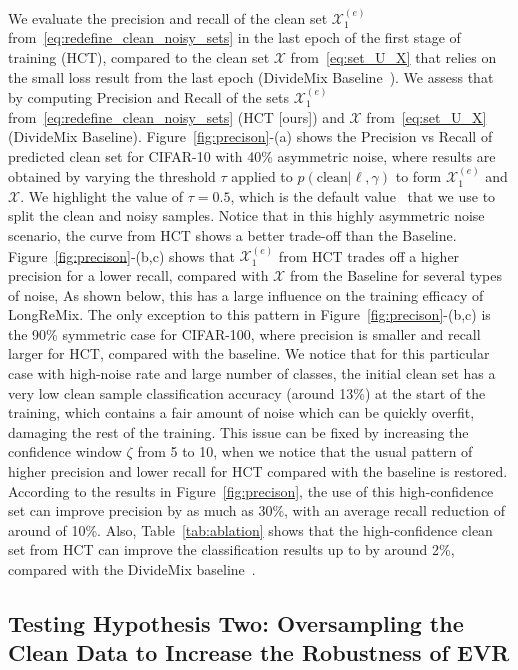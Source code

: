 \documentclass[review]{elsarticle}
\begin{document}
We evaluate the precision and recall of the clean set $\mathcal{X}_1^{(e)}$ from~\eqref{eq:redefine_clean_noisy_sets} in the last epoch of the first stage of training (HCT), 
compared to the clean set $\mathcal{X}$ from~\eqref{eq:set_U_X} that relies on the small loss result from the last epoch (DivideMix Baseline~\cite{li2020dividemix}). 
We assess that by computing Precision and Recall 
of the sets $\mathcal{X}_1^{(e)}$ from~\eqref{eq:redefine_clean_noisy_sets} (HCT [ours]) and $\mathcal{X}$ from~\eqref{eq:set_U_X} (DivideMix Baseline).
Figure~\ref{fig:precison}-(a) shows the Precision vs Recall of predicted clean set for CIFAR-10 with 40\% asymmetric noise, where results are obtained by varying the threshold $\tau$ applied to  $p(\text{clean}|\ell,\gamma)$ to form $\mathcal{X}_1^{(e)}$ and $\mathcal{X}$. 
We highlight the value of $\tau=0.5$, which is the default value~\cite{li2020dividemix} that we use to split the clean and noisy samples. Notice that in this highly asymmetric noise scenario, the curve from HCT shows a better trade-off than the Baseline.
Figure~\ref{fig:precison}-(b,c) shows that $\mathcal{X}_1^{(e)}$ from HCT trades off a higher precision for a lower recall, compared with $\mathcal{X}$ from the Baseline for several types of noise,  As shown below, this has a large influence on the training efficacy of LongReMix. 
The only exception to this pattern in Figure~\ref{fig:precison}-(b,c) is the 90\% symmetric case for CIFAR-100, where precision is smaller and recall larger for HCT, compared with the baseline.  We notice that for this particular case with high-noise rate and large number of classes, the initial clean set has a very low clean sample classification accuracy (around 13\%) at the start of the training, which contains a fair amount of noise which can be quickly overfit, damaging the rest of the training.  This issue can be fixed by increasing the confidence window $\zeta$ from 5 to 10, when we notice that the usual pattern of higher precision and lower recall for HCT compared with the baseline is restored. According to the  results in Figure~\ref{fig:precison}, the use of this high-confidence set can improve precision by as much as 30\%, with an average recall reduction of around of 10\%.
Also, Table~\ref{tab:ablation} shows that the high-confidence clean set from HCT can improve the classification results up to by around 2\%, compared with the DivideMix baseline~\cite{li2020dividemix}. 


\subsection{Testing Hypothesis Two: Oversampling the Clean Data to Increase the Robustness of EVR}
\label{sec:hypothesis_two_empirical_results}
\end{document}
